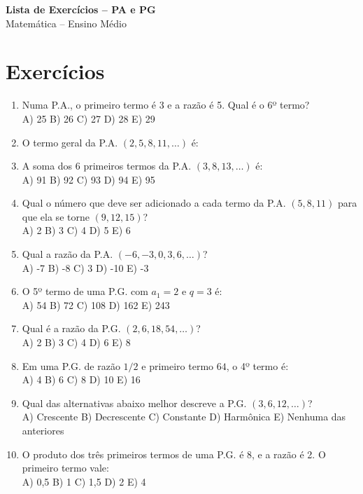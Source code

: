\documentclass[12pt,a4paper]{article}
\begin{document}
\begin{center}
    {\LARGE \textbf{Lista de Exercícios – PA e PG}} \\[0.2cm]
    {\large Matemática – Ensino Médio}
\end{center}

\vspace{0.8cm}

\section*{Exercícios}

\begin{enumerate}
    \item Numa P.A., o primeiro termo é 3 e a razão é 5. Qual é o 6º termo? \\  
    A) 25 \quad B) 26 \quad C) 27 \quad D) 28 \quad E) 29

    \item O termo geral da P.A. $(2,5,8,11,\dots)$ é: \\

    \item A soma dos 6 primeiros termos da P.A. $(3, 8, 13, \dots)$ é:  \\
    A) 91 \quad B) 92 \quad C) 93 \quad D) 94 \quad E) 95

    \item Qual o número que deve ser adicionado a cada termo da P.A. $(5, 8, 11)$ para que ela se torne $(9, 12, 15)$?   \\
    A) 2 \quad B) 3 \quad C) 4 \quad D) 5 \quad E) 6

    \item Qual a razão da P.A. $(-6, -3, 0, 3, 6, \dots)$? \\ 
    A) -7 \quad B) -8 \quad C) 3 \quad D) -10 \quad E) -3

    \item O 5º termo de uma P.G. com $a_1 = 2$ e $q = 3$ é: \\ 
    A) 54 \quad B) 72 \quad C) 108 \quad D) 162 \quad E) 243

    \item Qual é a razão da P.G. $(2, 6, 18, 54, \dots)$? \\ 
    A) 2 \quad B) 3 \quad C) 4 \quad D) 6 \quad E) 8

    \item Em uma P.G. de razão $1/2$ e primeiro termo $64$, o 4º termo é: \\  
    A) 4 \quad B) 6 \quad C) 8 \quad D) 10 \quad E) 16

    \item Qual das alternativas abaixo melhor descreve a P.G. $(3, 6, 12, \dots)$?   \\
    A) Crescente \quad B) Decrescente \quad C) Constante \quad D) Harmônica \quad E) Nenhuma das anteriores

    \item O produto dos três primeiros termos de uma P.G. é 8, e a razão é 2. O primeiro termo vale:   \\
    A) 0,5 \quad B) 1 \quad C) 1,5 \quad D) 2 \quad E) 4
\end{enumerate}
\end{document}
